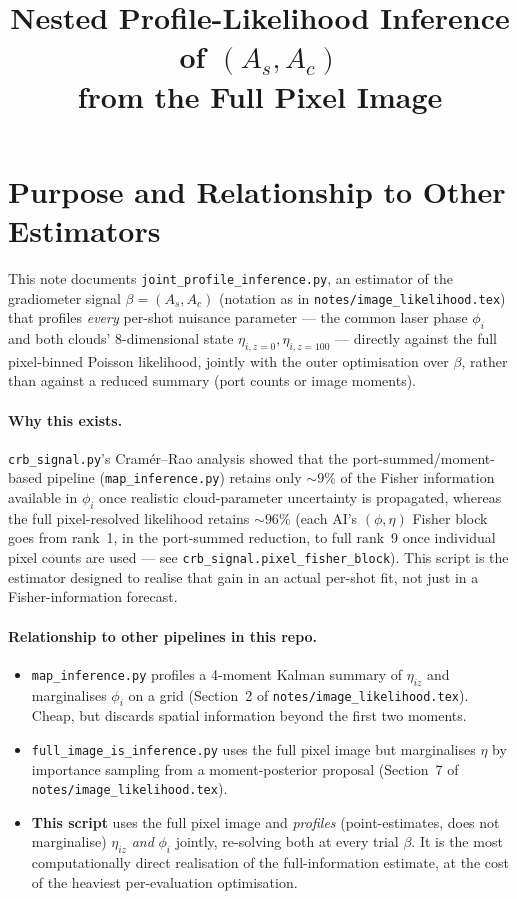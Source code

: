 \documentclass[11pt,a4paper]{article}
\title{%
  Nested Profile-Likelihood Inference of $(A_s,A_c)$\\
  from the Full Pixel Image\\[4pt]
  \large \code{python-scripts/joint\_profile\_inference.py}
}
\author{}
\date{}
\newcommand{\code}[1]{\texttt{#1}}
\begin{document}
\maketitle
\tableofcontents
\newpage

\section{Purpose and Relationship to Other Estimators}
\label{sec:purpose}

This note documents \code{joint\_profile\_inference.py}, an estimator of the
gradiometer signal $\beta = (A_s, A_c)$ (notation as in
\code{notes/image\_likelihood.tex}) that profiles \emph{every} per-shot
nuisance parameter --- the common laser phase $\phi_i$ and both clouds'
8-dimensional state $\eta_{i,z=0}, \eta_{i,z=100}$ --- directly against the
full pixel-binned Poisson likelihood, jointly with the outer optimisation
over $\beta$, rather than against a reduced summary (port counts or image
moments).

\paragraph{Why this exists.} \code{crb\_signal.py}'s Cram\'er--Rao analysis
showed that the port-summed/moment-based pipeline (\code{map\_inference.py})
retains only $\sim\!9\%$ of the Fisher information available in $\phi_i$ once
realistic cloud-parameter uncertainty is propagated, whereas the full
pixel-resolved likelihood retains $\sim\!96\%$ (each AI's $(\phi,\eta)$
Fisher block goes from rank~1, in the port-summed reduction, to full rank~9
once individual pixel counts are used --- see
\code{crb\_signal.pixel\_fisher\_block}). This script is the estimator
designed to realise that gain in an actual per-shot fit, not just in a
Fisher-information forecast.

\paragraph{Relationship to other pipelines in this repo.}
\begin{itemize}
  \item \code{map\_inference.py} profiles a 4-moment Kalman summary of
    $\eta_{iz}$ and marginalises $\phi_i$ on a grid (Section~2 of
    \code{notes/image\_likelihood.tex}). Cheap, but discards spatial
    information beyond the first two moments.
  \item \code{full\_image\_is\_inference.py} uses the full pixel image but
    marginalises $\eta$ by importance sampling from a moment-posterior
    proposal (Section~7 of \code{notes/image\_likelihood.tex}).
  \item \textbf{This script} uses the full pixel image and \emph{profiles}
    (point-estimates, does not marginalise) $\eta_{iz}$ \emph{and} $\phi_i$
    jointly, re-solving both at every trial $\beta$. It is the most
    computationally direct realisation of the full-information estimate,
    at the cost of the heaviest per-evaluation optimisation.
\end{itemize}
\end{document}
